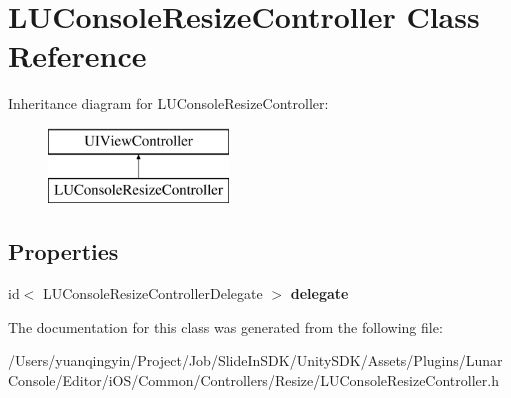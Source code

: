 \hypertarget{interface_l_u_console_resize_controller}{}\section{L\+U\+Console\+Resize\+Controller Class Reference}
\label{interface_l_u_console_resize_controller}
Inheritance diagram for L\+U\+Console\+Resize\+Controller\+:\begin{figure}[H]
\begin{center}
\leavevmode
\includegraphics[height=2.000000cm]{interface_l_u_console_resize_controller}
\end{center}
\end{figure}
\subsection*{Properties}
\begin{DoxyCompactItemize}
\item 
\mbox{\label{interface_l_u_console_resize_controller_ab7bd8c138c21b4ab9e12e340d3688fd3}} 
id$<$ L\+U\+Console\+Resize\+Controller\+Delegate $>$ {\bfseries delegate}
\end{DoxyCompactItemize}


The documentation for this class was generated from the following file\+:\begin{DoxyCompactItemize}
\item 
/\+Users/yuanqingyin/\+Project/\+Job/\+Slide\+In\+S\+D\+K/\+Unity\+S\+D\+K/\+Assets/\+Plugins/\+Lunar\+Console/\+Editor/i\+O\+S/\+Common/\+Controllers/\+Resize/L\+U\+Console\+Resize\+Controller.\+h\end{DoxyCompactItemize}
